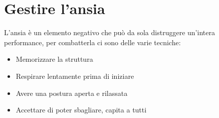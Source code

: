\documentclass[12pt,a4paper]{article}
\let\oldsection\section
\renewcommand{\section}{\clearpage\oldsection}
\begin{document}
\section{Gestire l'ansia}
L'ansia è un elemento negativo che può da sola distruggere un'intera performance, per combatterla ci sono delle varie tecniche:
\begin{itemize}
    \item Memorizzare la struttura
    \item Respirare lentamente prima di iniziare
    \item Avere una postura aperta e rilassata
    \item Accettare di poter sbagliare, capita a tutti
\end{itemize}
\end{document}
